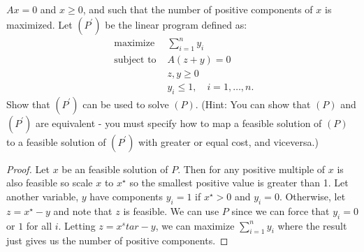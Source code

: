 \documentclass{article}
\begin{document}
\begin{jacklist}
\begin{framed}
        $A x=0$ and $x \geq 0$, and such that the number of positive components of $x$ is maximized. Let $\left(P^{\prime}\right)$ 
        be the linear program defined as: 
        \[ 
            \begin{aligned}
                \text { maximize } & \sum_{i=1}^{n} y_{i} \\
                \text { subject to } & A(z+y)=0 \\
                & z, y \geq 0 \\
                & y_{i} \leq 1, \quad i=1, \ldots, n .
            \end{aligned}
        \] Show that $\left(P^{\prime}\right)$ can be used to solve $(P)$. (Hint: You can show that $(P)$ and $\left(P^{\prime}\right)$ 
        are equivalent - you must specify how to map a feasible solution of $(P)$ to a feasible solution of 
        $\left(P^{\prime}\right)$ with greater or equal cost, and viceversa.)
    \end{framed}
    \begin{proof}
        Let $x$ be an feasible solution of $P$. Then for any positive multiple of $x$ is also feasible so scale $x$ to $x^\star$ so
        the smallest positive value is greater than 1. Let another variable, $y$ have components $y_i = 1$ if $x^\star > 0$ and $y_i = 
        0$. Otherwise, let $z = x^\star -y$ and note that $z$ is feasible. We can use $P$ since we can force that $y_i = 0$ or $1$ 
        for all $i$. Letting $z = x^star - y$, we can maximize $\sum_{i=1}^ny_i$ where the result just gives us the number of positive 
        components. 
    \end{proof}
\end{jacklist}
\end{document}
